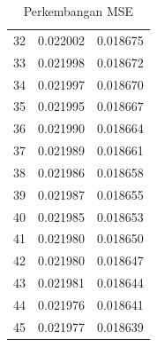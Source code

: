 \begin{table}
\begin{center}
\begin{tabular}{lrr}
      32 &  0.022002 &  0.018675 \\
      33 &  0.021998 &  0.018672 \\
      34 &  0.021997 &  0.018670 \\
      35 &  0.021995 &  0.018667 \\
      36 &  0.021990 &  0.018664 \\
      37 &  0.021989 &  0.018661 \\
      38 &  0.021986 &  0.018658 \\
      39 &  0.021987 &  0.018655 \\
      40 &  0.021985 &  0.018653 \\
      41 &  0.021980 &  0.018650 \\
      42 &  0.021980 &  0.018647 \\
      43 &  0.021981 &  0.018644 \\
      44 &  0.021976 &  0.018641 \\
      45 &  0.021977 &  0.018639 \\
      \bottomrule
      \end{tabular}
      
  \end{center}
  \caption{Perkembangan MSE}
  \label{Tab:perkembangan_mse}
\end{table}
